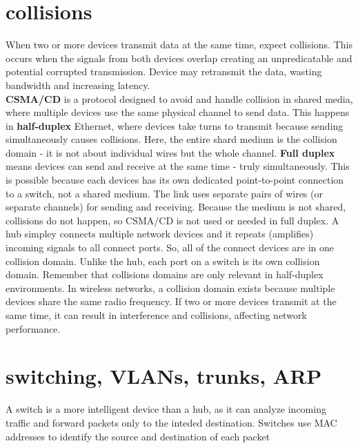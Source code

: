 \documentclass{article}
\begin{document}
\section*{collisions}
When two or more devices transmit data at the same time, expect collisions. This occurs when the signals from both devices overlap creating an unpredicatable and potential corrupted transmission. Device may retransmit the data, wasting bandwidth and increasing latency.\\ 

\textbf{CSMA/CD} is a protocol designed to avoid and handle collision in shared media, where multiple devices use the same physical channel to send data. This happens in \textbf{half-duplex} Ethernet, where devices take turns to transmit because sending simultaneously causes collisions. Here, the entire shard medium is the collision domain - it is not about individual wires but the whole channel. \textbf{Full duplex} means devices can send and receive at the same time - truly simultaneously. This is possible because each devices has its own dedicated point-to-point connection to a switch, not a shared medium. The link uses separate pairs of wires (or separate channels) for sending and receiving. Because the medium is not shared, collisions do not happen, so CSMA/CD is not used or needed in full duplex. A hub simpley connects multiple network devices and it repeats (amplifies) incoming signals to all connect ports. So, all of the connect devices are in one collision domain. Unlike the hub, each port on a switch is its own collision domain. Remember that collisions domains are only relevant in half-duplex environments. In wireless networks, a collision domain exists because multiple devices share the same radio frequency. If two or more devices transmit at the same time, it can result in interference and collisions, affecting network performance.\\

\section*{switching, VLANs, trunks, ARP}
A switch is a more intelligent device than a hub, as it can analyze incoming traffic and forward packets only to the inteded destination. Switches use MAC addresses to identify the source and destination of each packet\\
\end{document}
